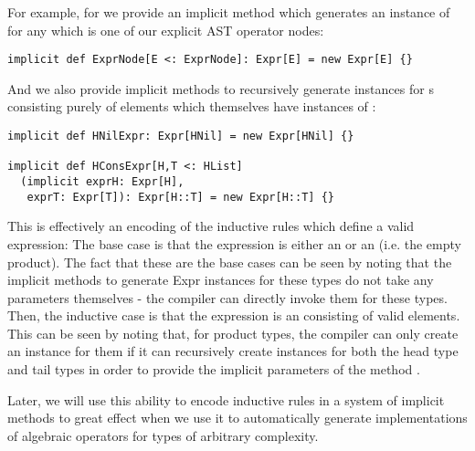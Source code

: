 For example, for  we provide an implicit method which generates an instance of  for any  which is one of our explicit AST operator nodes:
\vs \begin{lstlisting}
implicit def ExprNode[E <: ExprNode]: Expr[E] = new Expr[E] {}
\end{lstlisting} \vs
And we also provide implicit methods to recursively generate instances for s consisting purely of elements which themselves have instances of :
\vs\begin{lstlisting}
implicit def HNilExpr: Expr[HNil] = new Expr[HNil] {}

implicit def HConsExpr[H,T <: HList]
  (implicit exprH: Expr[H],
   exprT: Expr[T]): Expr[H::T] = new Expr[H::T] {}
\end{lstlisting}\vs

This is effectively an encoding of the inductive rules which define a valid expression: The base case is that the expression is either an  or an  (i.e. the empty product). The fact that these are the base cases can be seen by noting that the implicit methods to generate Expr instances for these types do not take any parameters themselves - the compiler can directly invoke them for these types. Then, the inductive case is that the expression is an  consisting of valid  elements. This can be seen by noting that, for product types, the compiler can only create an  instance for them if it can recursively create  instances for both the head type and tail types in order to provide the implicit parameters of the method .

Later, we will use this ability to encode inductive rules in a system of implicit methods to great effect when we use it to automatically generate implementations of algebraic operators for types of arbitrary complexity.


